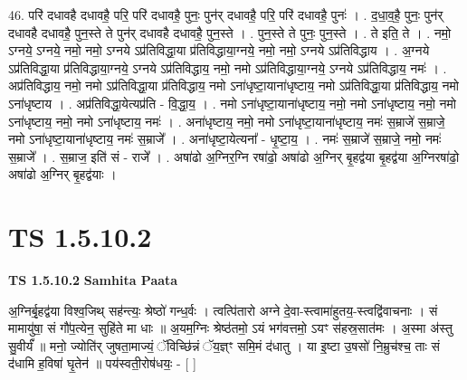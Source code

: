 \documentclass[17pt]{extarticle}
\begin{document}
46. परि॑ दधावहै दधावहै॒ परि॒ परि॑ दधावहै॒ पुनः॒ पुन॑र् दधावहै॒ परि॒ परि॑ दधावहै॒ पुनः॑ । . द॒धा॒व॒है॒ पुनः॒ पुन॑र् दधावहै दधावहै॒ पुन॒स्ते ते पुन॑र् दधावहै दधावहै॒ पुन॒स्ते । . पुन॒स्ते ते पुनः॒ पुन॒स्ते । . ते इति॒ ते । . नमो॒ ऽग्नये॒ ऽग्नये॒ नमो॒ नमो॒ ऽग्नये ऽप्र॑तिविद्धा॒या प्र॑तिविद्धाया॒ग्नये॒ नमो॒ नमो॒ ऽग्नये ऽप्र॑तिविद्धाय । . अ॒ग्नये ऽप्र॑तिविद्धा॒या प्र॑तिविद्धाया॒ग्नये॒ ऽग्नये ऽप्र॑तिविद्धाय॒ नमो॒ नमो ऽप्र॑तिविद्धाया॒ग्नये॒ ऽग्नये ऽप्र॑तिविद्धाय॒ नमः॑ । . अप्र॑तिविद्धाय॒ नमो॒ नमो ऽप्र॑तिविद्धा॒या प्र॑तिविद्धाय॒ नमो ऽना॑धृष्टा॒याना॑धृष्टाय॒ नमो ऽप्र॑तिविद्धा॒या प्र॑तिविद्धाय॒ नमो ऽना॑धृष्टाय । . अप्र॑तिविद्धा॒येत्यप्र॑ति - वि॒द्धा॒य॒ । . नमो ऽना॑धृष्टा॒याना॑धृष्टाय॒ नमो॒ नमो ऽना॑धृष्टाय॒ नमो॒ नमो ऽना॑धृष्टाय॒ नमो॒ नमो ऽना॑धृष्टाय॒ नमः॑ । . अना॑धृष्टाय॒ नमो॒ नमो ऽना॑धृष्टा॒याना॑धृष्टाय॒ नमः॑ स॒म्राजे॑ स॒म्राजे॒ नमो ऽना॑धृष्टा॒याना॑धृष्टाय॒ नमः॑ स॒म्राजे᳚ । . अना॑धृष्टा॒येत्यना᳚ - धृ॒ष्टा॒य॒ । . नमः॑ स॒म्राजे॑ स॒म्राजे॒ नमो॒ नमः॑ स॒म्राजे᳚ । . स॒म्राज॒ इति॑ सं - राजे᳚ । . अषा॑ढो अ॒ग्निर॒ग्नि रषा॑ढो॒ अषा॑ढो अ॒ग्निर् बृ॒हद्व॑या बृ॒हद्व॑या अ॒ग्निरषा॑ढो॒ अषा॑ढो अ॒ग्निर् बृ॒हद्व॑याः । \newline
\pagebreak
{}
\section*{ TS 1.5.10.2 }

\textbf{TS 1.5.10.2 } \newline
\textbf{Samhita Paata} \newline

अ॒ग्निर्बृ॒हद्व॑या विश्व॒जिथ् सह॑न्त्यः॒ श्रेष्ठो॑ गन्ध॒र्वः । त्वत्पि॑तारो अग्ने दे॒वा-स्त्वामा॑हुतय॒-स्त्वद्वि॑वाचनाः । सं मामायु॑षा॒ सं गौ॑प॒त्येन॒ सुहि॑ते मा धाः ॥ अ॒यम॒ग्निः श्रेष्ठ॑तमो॒ ऽयं भग॑वत्तमो॒ ऽयꣳ स॑हस्र॒सात॑मः । अ॒स्मा अ॑स्तु सु॒वीर्यं᳚ ॥ मनो॒ ज्योति॑र् जुषता॒माज्यं॒ ॅविच्छि॑न्नं ॅय॒ज्ञ्ꣳ समि॒मं द॑धातु । या इ॒ष्टा उ॒षसो॑ नि॒म्रुच॑श्च॒ ताः सं द॑धामि ह॒विषा॑ घृ॒तेन॑ ॥ पय॑स्वती॒रोष॑धयः॒ - [ ] \newline
\end{document}
